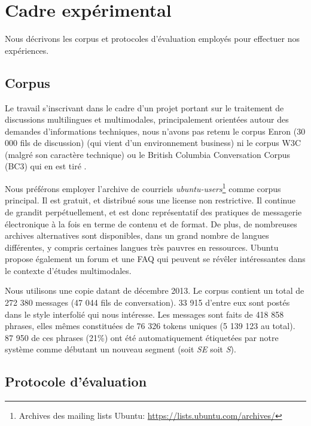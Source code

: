 
\chapter{Cadre expérimental}

\label{ch:experimental_framework}

Nous décrivons les corpus et protocoles d'évaluation employés pour effectuer nos expériences.

\section{Corpus}

Le travail s'inscrivant dans le cadre d'un projet portant sur le traitement de discussions multilingues et multimodales, principalement orientées autour des demandes d'informations techniques, nous n'avons pas retenu le corpus Enron (30 000 fils de discussion) \cite{klimt:2004:enron} (qui vient d'un environnement business) ni le corpus W3C (malgré son caractère technique) ou le British Columbia Conversation Corpus (BC3) qui en est tiré \cite{ulrich:2008:bc3}.

Nous préférons employer l'archive de courriels \textit{ubuntu-users}\footnote{Archives des mailing lists Ubuntu: \url{https://lists.ubuntu.com/archives/}} comme corpus principal. Il est gratuit, et distribué sous une license non restrictive. Il continue de grandit perpétuellement, et est donc représentatif des pratiques de messagerie électronique à la fois en terme de contenu et de format. De plus, de nombreuses archives alternatives sont disponibles, dans un grand nombre de langues différentes, y compris certaines langues très pauvres en ressources. Ubuntu propose également un forum et une FAQ qui peuvent se révêler intéressantes dans le contexte d'études multimodales.

Nous utilisons une copie datant de décembre 2013. Le corpus contient un total de 272 380 messages (47 044 fils de conversation). 33 915 d'entre eux sont postés dans le style interfolié qui nous intéresse. Les messages sont faits de 418 858 phrases, elles mêmes constituées de 76 326 tokens uniques (5 139 123 au total). 87 950 de ces phrases (21\%) ont été automatiquement étiquetées par notre système comme débutant un nouveau segment (soit \textit{SE} soit \textit{S}).

\section{Protocole d'évaluation}

